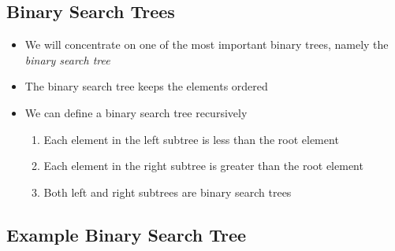 
\begin{slide}
\section{Binary Search Trees}

\begin{PauseHighLight}
  \begin{itemize}
  \item We will concentrate on one of the most important binary trees,
    namely the \emph{binary search tree}\pause
  \item The binary search tree keeps the elements ordered\pause
  \item We can define a binary search tree recursively\pause
    \begin{enumerate}
    \item Each element in the left subtree is less than the root element\pause
    \item Each element in the right subtree is greater than the root
      element\pause
    \item Both left and right subtrees are binary search trees\pause
    \end{enumerate}
  \end{itemize}
\end{PauseHighLight}
\end{slide}


\begin{slide}
\section[-1]{Example Binary Search Tree}

\begin{PauseHighLight}
  \begin{center}
    \pause
  \end{center}
\end{PauseHighLight}

\end{slide}


